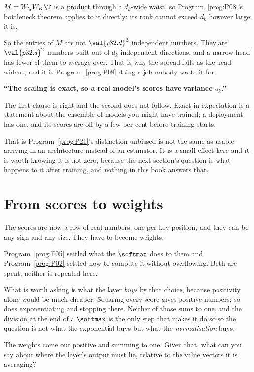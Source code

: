 \begin{fr}

$M = W_Q W_K\T$ is a product through a $d_k$-wide waist, so
Program~\ref{prog:P08}'s bottleneck theorem applies to it directly: its rank
cannot exceed $d_k$ however large it is.

So the entries of $M$ are not $\val{p32.d}^{2}$ independent numbers. They are
$\val{p32.d}^{2}$ numbers built out of $d_k$ independent directions, and a
narrow head has fewer of them to average over. That is why the spread falls
as the head widens, and it is Program~\ref{prog:P08} doing a job nobody
wrote it for.

\begin{trapbox}
\textbf{\enquote{The scaling is exact, so a real model's scores have
variance $d_k$.}}

The first clause is right and the second does not follow. Exact in
expectation is a statement about the ensemble of models you might have
trained; a deployment has one, and its scores are off by a few per cent
before training starts.

That is Program~\ref{prog:P21}'s distinction \dash{} unbiased is not the
same as usable \dash{} arriving in an architecture instead of an estimator.
It is a small effect here and it is worth knowing it is not zero, because
the next section's question is what happens to it after training, and
nothing in this book answers that.
\end{trapbox}
\end{fr}


\section{From scores to weights}
\label{sec:P32-softmax}

\begin{fr}
The scores are now a row of real numbers, one per key position, and they can
be any sign and any size. They have to become weights.

Program~\ref{prog:F05} settled what the $\softmax$ does to them and
Program~\ref{prog:P02} settled how to compute it without overflowing. Both
are spent; neither is repeated here.

What is worth asking is what the layer \emph{buys} by that choice, because
positivity alone would be much cheaper. Squaring every score gives positive
numbers; so does exponentiating and stopping there. Neither of those sums to
one, and the division at the end of a $\softmax$ is the only step that makes
it do so \dash{} so the question is not what the exponential buys but what
the \emph{normalisation} buys.

The weights come out positive and summing to one. Given that, what can you say
about where the layer's output must lie, relative to the value vectors it is
averaging?
\dotline
\nextframe
\end{fr}

